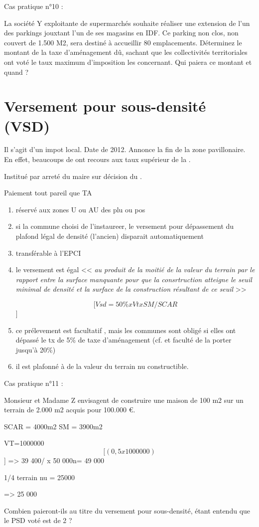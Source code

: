 Cas pratique n°10 :

La société Y exploitante de supermarchés souhaite réaliser une extension de l’un des parkings jouxtant l’un de ses magasins en IDF. Ce parking non clos, non couvert de 1.500 M2, sera destiné à accueillir 80 emplacements.
Déterminez le montant de la taxe d’aménagement dû, sachant que les collectivités territoriales ont voté le taux maximum d’imposition les concernant.
Qui paiera ce montant et quand ?


\section{Versement pour sous-densité (VSD)}

	Il s'agit d'un impot local.
	Date de 2012. Annonce la fin de la zone pavillonaire. En effet, beaucoups de \colloc ont recours aux taux supérieur de la \ta.

	Institué par arreté du maire sur décision du \CM.

	Paiement tout pareil que TA

	\begin{enumerate}
		\item réservé aux zones U ou AU des plu ou pos
		\item si la commune choisi de l'instaureer, le versement pour dépassement du plafond légal de densité (l'ancien) disparait automatiquement
		\item transférable à l'EPCI
		\item le versement est égal
			<< {\itshape au produit de la moitié de la valeur du terrain par le rapport entre la surface manquante pour que la consrtruction atteigne le seuil minimal de densité et la surface de la construction résultant de ce seuil} >>

			\[[ Vsd = 50\% x Vt x SM/SCAR \]]
		\item ce prélevement est facultatif , mais les communes sont obligé si elles ont dépassé le tx de 5\% de taxe d'aménagement (cf. \ta et faculté de la porter jusqu'à 20\%)

		\item il est plafonné à  de la valeur du terrain nu constructible.
	\end{enumerate}

Cas pratique n°11 :


Monsieur et Madame Z envisagent de construire une maison de 100 m2 sur un terrain de 2.000 m2 acquis pour 100.000 €.

SCAR = 4000m2
SM = 3900m2

VT=1000000
\[[ (0,5 x 1000000)\]]
=> 39 400/ x 50 000n= 49 000

1/4 terrain nu = 25000

=> 25 000

Combien paieront-ils au titre du versement pour sous-densité, étant entendu que le PSD voté est de 2 ?
